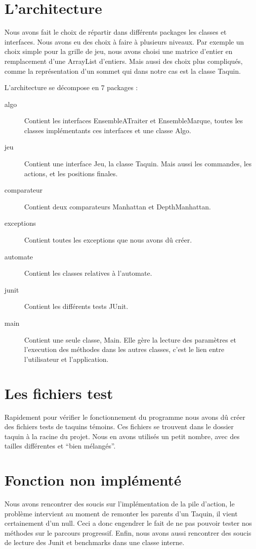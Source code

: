 ﻿\documentclass[a4paper,twoside,12pt]{report}
\begin{document}
\section{L'architecture}
\par
Nous avons fait le choix de r\'epartir dans diff\'erents packages les classes et 
interfaces. Nous avons eu des choix \`a faire \`a plusieurs niveaux. Par
exemple un choix simple pour la grille de jeu, nous avons choisi une matrice 
d'entier en remplacement d'une ArrayList d'entiers. Mais aussi des choix plus
compliqu\'es, comme la repr\'esentation d'un sommet qui dans notre cas est la classe 
Taquin.
\par\noindent
L'architecture se d\'ecompose en 7 packages : 
\begin{description}
 \item [algo] Contient les interfaces EnsembleATraiter et EnsembleMarque, toutes 
les classes impl\'ementants ces interfaces et une classe Algo.
 \item [jeu] Contient une interface Jeu, la classe Taquin. Mais aussi les 
commandes, les actions, et les positions finales.
 \item [comparateur] Contient deux comparateurs Manhattan et DepthManhattan.
 \item [exceptions] Contient toutes les exceptions que nous avons d\^u cr\'eer.
 \item [automate] Contient les classes relatives \`a l'automate.
 \item [junit] Contient les diff\'erents tests JUnit.
 \item [main] Contient une seule classe, Main. Elle g\`ere la lecture des 
param\`etres et l'execution des m\'ethodes dans les autres classes, c'est
 le lien entre l'utilisateur et l'application.
\end{description}

\section{Les fichiers test}
\par
Rapidement pour v\'erifier le fonctionnement du programme nous avons d\^u cr\'eer des fichiers tests de taquins t\'emoins. Ces fichiers se trouvent dans le dossier taquin
\`a la racine du projet. Nous en avons utilis\'es un petit nombre, avec des tailles diff\'erentes et ``bien m\'elang\'es''.
%
\section{Fonction non impl\'ement\'e}
Nous avons rencontrer des soucis sur l'impl\'ementation de la pile d'action, le probl\`eme intervient au moment de remonter les parents d'un Taquin, il vient
certainement d'un null. Ceci a donc engendrer le fait de ne pas pouvoir tester nos m\'ethodes sur le parcours progressif.
Enfin, nous avons aussi rencontrer des soucis de lecture des Junit et benchmarks dans une classe interne.
\end{document}
